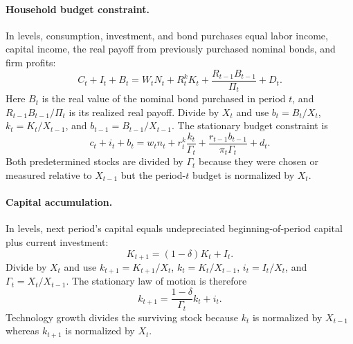 \documentclass[12pt,final]{article}
\begin{document}
\paragraph{Household budget constraint.}
In levels, consumption, investment, and bond purchases equal labor income,
capital income, the real payoff from previously purchased nominal bonds, and
firm profits:
\begin{equation}
  C_t+I_t+B_t
  =W_tN_t+R_t^kK_t
  +\frac{R_{t-1}B_{t-1}}{\Pi_t}+D_t.
  \label{eq:budget-level}
\end{equation}
Here $B_t$ is the real value of the nominal bond purchased in period $t$, and
$R_{t-1}B_{t-1}/\Pi_t$ is its realized real payoff.  Divide by $X_t$ and use
$b_t=B_t/X_t$, $k_t=K_t/X_{t-1}$, and
$b_{t-1}=B_{t-1}/X_{t-1}$.  The stationary budget constraint is
\begin{equation}
  c_t+i_t+b_t
  =w_tn_t+r_t^k\frac{k_t}{\Gamma_t}
  +\frac{r_{t-1}b_{t-1}}{\pi_t\Gamma_t}+d_t.
  \label{eq:budget}
\end{equation}
Both predetermined stocks are divided by $\Gamma_t$ because they were chosen or
measured relative to $X_{t-1}$ but the period-$t$ budget is normalized by
$X_t$.

\paragraph{Capital accumulation.}
In levels, next period's capital equals undepreciated beginning-of-period
capital plus current investment:
\begin{equation}
  K_{t+1}=(1-\delta)K_t+I_t.
  \label{eq:capital-law-level}
\end{equation}
Divide by $X_t$ and use $k_{t+1}=K_{t+1}/X_t$,
$k_t=K_t/X_{t-1}$, $i_t=I_t/X_t$, and
$\Gamma_t=X_t/X_{t-1}$.  The stationary law of motion is therefore
\begin{equation}
  k_{t+1}=\frac{1-\delta}{\Gamma_t}k_t+i_t.
  \label{eq:capital-law}
\end{equation}
Technology growth divides the surviving stock because $k_t$ is normalized by
$X_{t-1}$ whereas $k_{t+1}$ is normalized by $X_t$.
\end{document}
